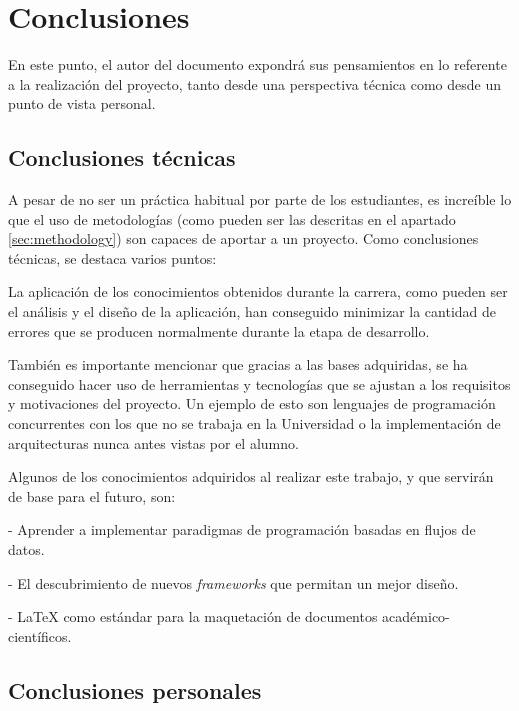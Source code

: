 
\section{Conclusiones} \label{sec:conclusions}

En este punto, el autor del documento expondrá sus pensamientos en lo referente a la realización del proyecto, tanto desde una perspectiva técnica como desde un punto de vista personal.\n

\subsection{Conclusiones técnicas} \label{sec:techconclusions}

A pesar de no ser un práctica habitual por parte de los estudiantes, es increíble lo que el uso de metodologías (como pueden ser las descritas en el apartado \ref{sec:methodology}) son capaces de aportar a un proyecto. Como conclusiones técnicas, se destaca varios puntos:\sn

La aplicación de los conocimientos obtenidos durante la carrera, como pueden ser el análisis y el diseño de la aplicación, han conseguido minimizar la cantidad de errores que se producen normalmente durante la etapa de desarrollo.\sn

También es importante mencionar que gracias a las bases adquiridas, se ha conseguido hacer uso de herramientas y tecnologías que se ajustan a los requisitos y motivaciones del proyecto. Un ejemplo de esto son lenguajes de programación concurrentes con los que no se trabaja en la Universidad o la implementación de arquitecturas nunca antes vistas por el alumno.\sn

Algunos de los conocimientos adquiridos al realizar este trabajo, y que servirán de base para el futuro, son:\sn

- Aprender a implementar paradigmas de programación basadas en flujos de datos.\sn

- El descubrimiento de nuevos \textit{frameworks} que permitan un mejor diseño.\sn

- \LaTeX \textbf{ }como estándar para la maquetación de documentos académico-científicos.\sn

\subsection{Conclusiones personales} \label{sec:personalconclusions}

